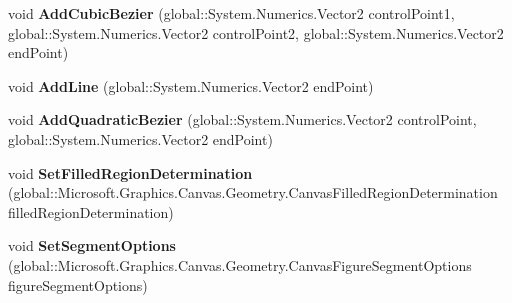 \begin{DoxyCompactItemize}
\item 
\mbox{\label{interface_microsoft_1_1_graphics_1_1_canvas_1_1_geometry_1_1_i_canvas_path_receiver_ab770bd039e07f19239a6f9f563ccd042}} 
void {\bfseries Add\+Cubic\+Bezier} (global\+::\+System.\+Numerics.\+Vector2 control\+Point1, global\+::\+System.\+Numerics.\+Vector2 control\+Point2, global\+::\+System.\+Numerics.\+Vector2 end\+Point)
\item 
\mbox{\label{interface_microsoft_1_1_graphics_1_1_canvas_1_1_geometry_1_1_i_canvas_path_receiver_af4c3299bef8e5d0a0d801f7e730857f9}} 
void {\bfseries Add\+Line} (global\+::\+System.\+Numerics.\+Vector2 end\+Point)
\item 
\mbox{\label{interface_microsoft_1_1_graphics_1_1_canvas_1_1_geometry_1_1_i_canvas_path_receiver_a782bc874c27fca70636c3657fbd63fb8}} 
void {\bfseries Add\+Quadratic\+Bezier} (global\+::\+System.\+Numerics.\+Vector2 control\+Point, global\+::\+System.\+Numerics.\+Vector2 end\+Point)
\item 
\mbox{\label{interface_microsoft_1_1_graphics_1_1_canvas_1_1_geometry_1_1_i_canvas_path_receiver_a0bcd3e4a427ddf33e3454ce466e35bec}} 
void {\bfseries Set\+Filled\+Region\+Determination} (global\+::\+Microsoft.\+Graphics.\+Canvas.\+Geometry.\+Canvas\+Filled\+Region\+Determination filled\+Region\+Determination)
\item 
\mbox{\label{interface_microsoft_1_1_graphics_1_1_canvas_1_1_geometry_1_1_i_canvas_path_receiver_a5492b54121b4ffc412071f8844a3b6aa}} 
void {\bfseries Set\+Segment\+Options} (global\+::\+Microsoft.\+Graphics.\+Canvas.\+Geometry.\+Canvas\+Figure\+Segment\+Options figure\+Segment\+Options)
\item 
\mbox{\label{interface_microsoft_1_1_graphics_1_1_canvas_1_1_geometry_1_1_i_canvas_path_receiver_acad2c777502ab1ccf0c33ff63873a7c9}} 

\end{DoxyCompactItemize}

